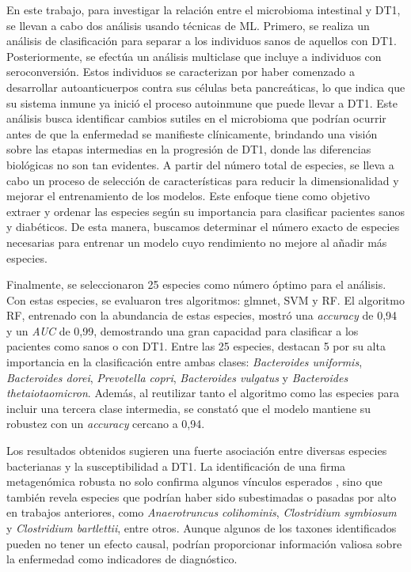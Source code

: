 En este trabajo, para investigar la relación entre el microbioma intestinal y DT1, se llevan a cabo dos análisis usando técnicas de ML. Primero, se realiza un análisis de clasificación para separar a los individuos sanos de aquellos con DT1. Posteriormente, se efectúa un análisis multiclase que incluye a individuos con seroconversión. Estos individuos se caracterizan por haber comenzado a desarrollar autoanticuerpos contra sus células beta pancreáticas, lo que indica que su sistema inmune ya inició el proceso autoinmune que puede llevar a DT1. Este análisis busca identificar cambios sutiles en el microbioma que podrían ocurrir antes de que la enfermedad se manifieste clínicamente, brindando una visión sobre las etapas intermedias en la progresión de DT1, donde las diferencias biológicas no son tan evidentes. A partir del número total de especies, se lleva a cabo un proceso de selección de características para reducir la dimensionalidad y mejorar el entrenamiento de los modelos. Este enfoque tiene como objetivo extraer y ordenar las especies según su importancia para clasificar pacientes sanos y diabéticos. De esta manera, buscamos determinar el número exacto de especies necesarias para entrenar un modelo cuyo rendimiento no mejore al añadir más especies.


Finalmente, se seleccionaron 25 especies como número óptimo para el análisis. Con estas especies, se evaluaron tres algoritmos: glmnet, SVM y RF. El algoritmo RF, entrenado con la abundancia de estas especies, mostró una \textit{accuracy} de 0,94 y un \textit{AUC} de 0,99, demostrando una gran capacidad para clasificar a los pacientes como sanos o con DT1. Entre las 25 especies, destacan 5 por su alta importancia en la clasificación entre ambas clases: \textit{Bacteroides uniformis}, \textit{Bacteroides dorei}, \textit{Prevotella copri}, \textit{Bacteroides vulgatus} y \textit{Bacteroides thetaiotaomicron}. Además, al reutilizar tanto el algoritmo como las especies para incluir una tercera clase intermedia, se constató que el modelo mantiene su robustez con un \textit{accuracy} cercano a 0,94.

Los resultados obtenidos sugieren una fuerte asociación entre diversas especies bacterianas y la susceptibilidad a DT1. La identificación de una firma metagenómica robusta no solo confirma algunos vínculos esperados \cite{higuchi2018intestinal, medina2019dietary, wu2020metagenomic}, sino que también revela especies que podrían haber sido subestimadas o pasadas por alto en trabajos anteriores, como \textit{Anaerotruncus colihominis}, \textit{Clostridium symbiosum} y \textit{Clostridium bartlettii}, entre otros. Aunque algunos de los taxones identificados pueden no tener un efecto causal, podrían proporcionar información valiosa sobre la enfermedad como indicadores de diagnóstico.


